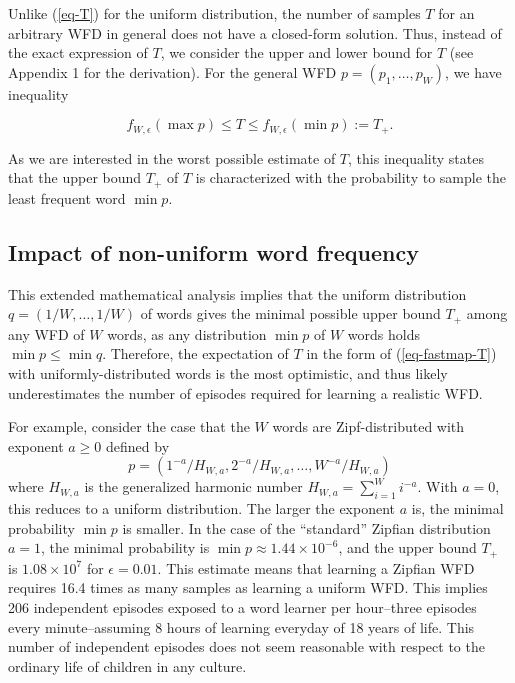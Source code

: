 \documentclass[a4paper,natbib,man]{apa6}
\begin{document}
Unlike (\ref{eq-T}) for the uniform distribution, the number of samples $T$ for an arbitrary WFD in general does not have a closed-form solution.
Thus, instead of the exact expression of $T$, we consider the upper and lower bound for $T$ (see Appendix 1 for the derivation).
For the general WFD $p = (p_{1}, \ldots, p_{W})$, we have inequality

\begin{equation}
f_{W, \epsilon}( \max p ) \le T \le f_{W, \epsilon}( \min p ) := T_{+}.
\label{eq-Tbound}
\end{equation}

As we are interested in the worst possible estimate of $T$, this inequality states that 
the upper bound $T_{+}$ of $T$ is characterized with 
the probability to sample the least frequent word $\min p$.

\subsection{Impact of non-uniform word frequency}
This extended mathematical analysis implies that the uniform distribution $q = (1/W, \ldots, 1/W)$ of words gives the minimal possible upper bound $T_{+}$ among any WFD of $W$ words, 
as any distribution $\min p$ of $W$ words holds $\min p \le \min q$.
Therefore, the expectation of $T$ in the form of (\ref{eq-fastmap-T}) with uniformly-distributed words is the most optimistic, and thus likely underestimates the number of episodes required for learning a realistic WFD.

For example, consider the case that the $W$ words are Zipf-distributed with exponent $a \ge 0$ defined by 
$$p = (1^{-a}/H_{W,a}, 2^{-a}/H_{W,a}, \ldots, W^{-a}/ H_{W,a})$$
where $H_{W,a}$ is the generalized harmonic number $H_{W,a} = \sum_{i=1}^{W}i^{-a}$.
With $a = 0$, this reduces to a uniform distribution.
The larger the exponent $a$ is, the minimal probability $\min p$ is smaller.
In the case of the ``standard'' Zipfian distribution $a=1$, the minimal probability is $\min p \approx 1.44 \times 10^{-6}$,
and the upper bound $T_{+}$ is $1.08 \times 10^{7}$ for $\epsilon = 0.01$.
This estimate means that learning a Zipfian WFD requires 16.4 times as many samples as learning a uniform WFD. %
This implies 206 independent episodes exposed to a word learner per hour--three episodes every minute--assuming 8 hours of learning everyday of 18 years of life. %
This number of independent episodes does not seem reasonable with respect to the ordinary life of children in any culture. %
\end{document}

